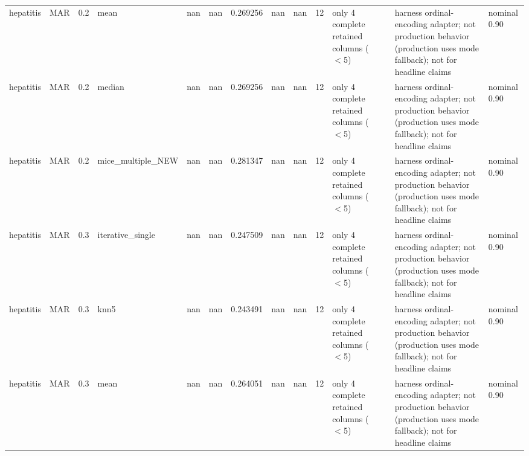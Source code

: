 \begin{table}[ht]
\begin{tabular}{llrlrrrrrrllll}
 hepatitis & MAR         &         0.2 & mean              &     nan        &           nan        &                 0.269256 &                   nan          &                       nan        &        12 & only 4 complete retained columns (\ensuremath{<}5) &                                                                       & harness ordinal-encoding adapter; not production behavior (production uses mode fallback); not for headline claims & nominal 0.90              \\
 hepatitis & MAR         &         0.2 & median            &     nan        &           nan        &                 0.269256 &                   nan          &                       nan        &        12 & only 4 complete retained columns (\ensuremath{<}5) &                                                                       & harness ordinal-encoding adapter; not production behavior (production uses mode fallback); not for headline claims & nominal 0.90              \\
 hepatitis & MAR         &         0.2 & mice\_multiple\_NEW &     nan        &           nan        &                 0.281347 &                   nan          &                       nan        &        12 & only 4 complete retained columns (\ensuremath{<}5) &                                                                       & harness ordinal-encoding adapter; not production behavior (production uses mode fallback); not for headline claims & nominal 0.90              \\
 hepatitis & MAR         &         0.3 & iterative\_single  &     nan        &           nan        &                 0.247509 &                   nan          &                       nan        &        12 & only 4 complete retained columns (\ensuremath{<}5) &                                                                       & harness ordinal-encoding adapter; not production behavior (production uses mode fallback); not for headline claims & nominal 0.90              \\
 hepatitis & MAR         &         0.3 & knn5              &     nan        &           nan        &                 0.243491 &                   nan          &                       nan        &        12 & only 4 complete retained columns (\ensuremath{<}5) &                                                                       & harness ordinal-encoding adapter; not production behavior (production uses mode fallback); not for headline claims & nominal 0.90              \\
 hepatitis & MAR         &         0.3 & mean              &     nan        &           nan        &                 0.264051 &                   nan          &                       nan        &        12 & only 4 complete retained columns (\ensuremath{<}5) &                                                                       & harness ordinal-encoding adapter; not production behavior (production uses mode fallback); not for headline claims & nominal 0.90              \\

\end{tabular}
\end{table}
